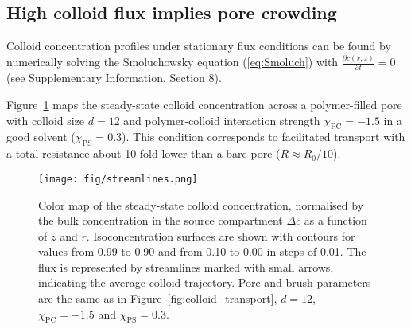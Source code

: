 \documentclass[12pt, a4paper]{article}
\begin{document}
\subsection{High colloid flux implies pore crowding}
Colloid concentration profiles under stationary flux conditions can be found by numerically solving  the Smoluchowsky equation (\ref{eq:Smoluch}) with $\frac{\partial c(r,z)}{\partial t} = 0$  (see Supplementary Information, Section 8). 

Figure~\ref{fig:colloid_concentration} maps the steady-state colloid concentration across a polymer-filled pore with colloid size $d = 12$ and polymer-colloid interaction strength $\chi_{\text{PC}} = -1.5$ in a good solvent ($\chi_{\text{PS}} = 0.3$).
This condition corresponds to facilitated transport with a total resistance about 10-fold lower than a bare pore ($R \approx R_0/10$).

\begin{figure}
    \centering
    \texttt{[image: fig/streamlines.png]}
    \caption{
    Color map of the steady-state colloid concentration, normalised by the bulk concentration in the source compartment $\Delta c$ as a function of $z$ and $r$.
    Isoconcentration surfaces are shown with contours for values from 0.99 to 0.90 and from 0.10 to 0.00 in steps of 0.01.
    The flux is represented by streamlines marked with small arrows, indicating the average colloid trajectory.
    Pore and brush parameters are the same as in Figure~\ref{fig:colloid_transport}, $d = 12$, $\chi_{\text{PC}} = -1.5$ and $\chi_{\text{PS}} = 0.3$.
    }
    \label{fig:colloid_concentration}
\end{figure}
\end{document}

